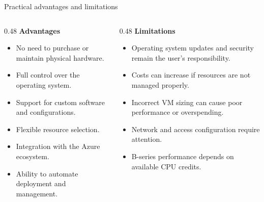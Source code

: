 \documentclass[aspectratio=169,xcolor=dvipsnames]{beamer}
\begin{document}
\begin{frame}{Practical advantages and limitations}
\begin{columns}[T]
    \begin{column}{0.48\textwidth}
        \textbf{\large Advantages}
        \begin{itemize}
            \item No need to purchase or maintain physical hardware.
            \item Full control over the operating system.
            \item Support for custom software and configurations.
            \item Flexible resource selection.
            \item Integration with the Azure ecosystem.
            \item Ability to automate deployment and management.
        \end{itemize}
    \end{column}

    \begin{column}{0.48\textwidth}
        \textbf{\large Limitations}
        \begin{itemize}
            \item Operating system updates and security remain the user's responsibility.
            \item Costs can increase if resources are not managed properly.
            \item Incorrect VM sizing can cause poor performance or overspending.
            \item Network and access configuration require attention.
            \item B-series performance depends on available CPU credits.
        \end{itemize}
    \end{column}
\end{columns}
\end{frame}
\end{document}
